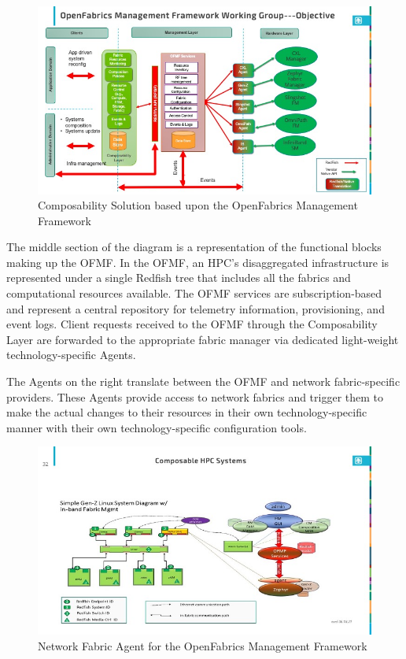 \begin{figure}[ComposableSolution]
  \centerline{\includegraphics[width=\columnwidth]{ComposabilityHL_Diagram.jpeg}}
  \caption{Composability Solution based upon the OpenFabrics Management Framework}
  \label{fig:ofmf}
\end{figure}

The middle section of the diagram is a representation of the functional blocks making up the OFMF.  In the OFMF, an HPC's disaggregated infrastructure is represented under a single Redfish tree that includes all the fabrics and computational resources available. The OFMF services are subscription-based and represent a central repository for telemetry information, provisioning, and event logs.  Client requests received to the OFMF through the Composability Layer are forwarded to the appropriate fabric manager via dedicated light-weight technology-specific Agents. 

The Agents on the right translate between the OFMF and network fabric-specific providers.  These Agents provide access to network fabrics and trigger them to make the actual changes to their resources in their own technology-specific manner with their own technology-specific configuration tools.  

\begin{figure}[Hardware Agent]
  \centerline{\includegraphics[width=\columnwidth]{Slide32.jpeg}}
  \caption{Network Fabric Agent for the OpenFabrics Management Framework}
  \label{fig:ofmf}
\end{figure}




